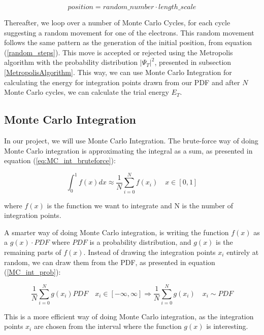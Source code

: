 \documentclass[norsk,a4paper,12pt]{article}
\begin{document}
\begin{equation}
    position =  random\_number \cdot length\_scale
    \label{random_steps}
\end{equation}

Thereafter, we loop over a number of Monte Carlo Cycles, for each cycle suggesting a random movement for one of the electrons. This random movement follows the same pattern as the generation of the initial position, from equation (\ref{random_steps}). This move is accepted or rejected using the Metropolis algorithm with the probability distribution $|\Psi_T|^2$, presented in subsection \ref{MetropolisAlgorithm}. This way, we can use Monte Carlo Integration for calculating the energy for integration points drawn from our PDF and after $N$ Monte Carlo cycles, we can calculate the trial energy $E_T$.

\subsection{Monte Carlo Integration}
In our project, we will use Monte Carlo Integration. The brute-force way of doing Monte Carlo integration is approximating the integral as a sum, as presented in equation (\ref{eq:MC_int_bruteforce}):

\begin{equation}
    \int_0^1 f(x) dx \approx  \frac{1}{N}\sum_{i=0}^N f(x_i) \quad x \in [0,1]
    \label{eq:MC_int_bruteforce}
\end{equation}

where $f(x)$ is the function we want to integrate and N is the number of integration points. 

A smarter way of doing Monte Carlo integration, is writing the function $f(x)$ as a $g(x)\cdot PDF$ where $PDF$ is a probability distribution, and $g(x)$ is the remaining parts of $f(x)$. Instead of drawing the integration points $x_i$ entirely at random, we can draw them from the PDF, as presented in equation (\ref{MC_int_prob}):

\begin{equation}
    \frac{1}{N}\sum_{i=0}^N g(x_i) PDF \quad x_i \in [-\infty, \infty] \Rightarrow \frac{1}{N} \sum_{i=0}^N g(x_i) \quad x_i \sim PDF
    \label{MC_int_prob}
\end{equation}

This is a more efficient way of doing Monte Carlo integration, as the integration points $x_i$ are chosen from the interval where the function $g(x)$ is interesting.\par 
\end{document}
